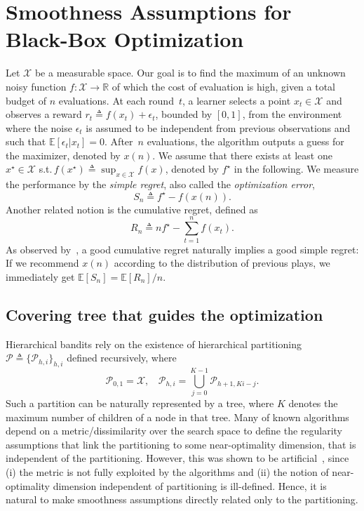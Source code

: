 \section{Smoothness Assumptions for Black-Box Optimization}\label{sec:gpo.pre}

Let $\mathcal{X}$ be a measurable space. Our goal is to find the maximum of an unknown noisy function $f:\mathcal{X}\rightarrow\mathbb{R}$ of which the cost of evaluation is high, given a total budget of $n$ evaluations. At each round~$t$, a learner selects a point $x_t\in\mathcal{X}$ and observes a reward $r_t\triangleq f(x_t)+\epsilon_t$, bounded by $[0,1]$, from the environment where the noise $\epsilon_t$ is assumed to be independent from previous observations and such that $\mathbb{E}[\epsilon_t|x_t] = 0$.
After~$n$ evaluations, the algorithm outputs a guess for the maximizer, denoted by $x(n)$. We assume that there exists at least one $x^\star \in \mathcal{X}$ s.t.\,$f(x^\star) \triangleq \sup_{x\in\mathcal{X}} f(x)$, denoted by $f^\star$ in the following. We measure the performance by the \emph{simple regret}, also called the \textit{optimization error},
\[
	S_n \triangleq f^\star - f(x(n)).
\]
Another related notion is the cumulative regret, defined as
\[
	R_n \triangleq nf^\star - \sum_{t=1}^n f(x_t).
\]
As observed by~\cite{bubeck2009pure}, a good cumulative regret naturally implies a good simple regret: If we  recommend $x(n)$ according to the distribution of previous plays, we immediately get $\mathbb{E}[S_n]=\mathbb{E}[R_n]/n$.

\subsection{Covering tree that guides the optimization}

Hierarchical bandits rely on the existence of hierarchical partitioning $\mathcal{P}\triangleq\{\mathcal{P}_{h,i}\}_{h,i}$ defined recursively, where
\[
	\mathcal{P}_{0,1} = \mathcal{X},  \ \ \ \
	\mathcal{P}_{h,i} = \bigcup_{j=0}^{K-1} \mathcal{P}_{h+1,Ki-j}.
\]
Such a partition can be naturally represented by a tree, where $K$ denotes the maximum number of children of a node in that tree. Many of known algorithms depend on a metric/dissimilarity over the search space to define the regularity assumptions that link the partitioning to some near-optimality dimension, that is independent of the partitioning. However, this was shown to be artificial~\citep{grill2015poo}, since (i) the metric is not fully exploited by the algorithms and (ii) the notion of near-optimality dimension independent of partitioning is ill-defined.
Hence, it is natural to make smoothness assumptions directly related only to the partitioning.

